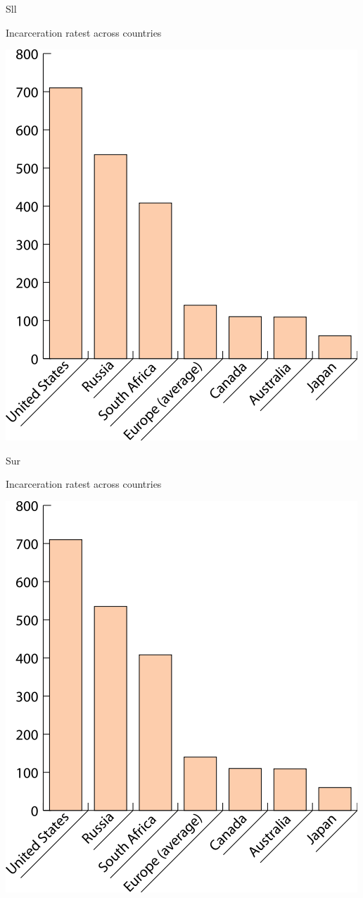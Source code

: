 \documentclass[print,Draft]{faosyb}
\begin{document}
\begin{chart}{S}{ll}
\caption{Incarceration ratest across countries}
\label{chart:incarceration}
\includegraphics[width=\chartwidth,height=\chartheight]{incarceration}  
\end{chart}

\begin{chart}{S}{ur}
\caption{Incarceration ratest across countries}
\label{chart:incarceration}
\includegraphics[width=\chartwidth,height=\chartheight]{incarceration}  
\end{chart}
\end{document}
